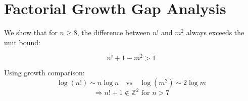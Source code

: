 
\section*{Factorial Growth Gap Analysis}

We show that for \( n \geq 8 \), the difference between \( n! \) and \( m^2 \) always exceeds the unit bound:

\[
n! + 1 - m^2 > 1
\]

Using growth comparison:
\[
\log(n!) \sim n\log n \quad \text{vs} \quad \log(m^2) \sim 2\log m
\]
\[
\Rightarrow n! + 1 \notin \mathbb{Z}^2 \text{ for } n > 7
\]
